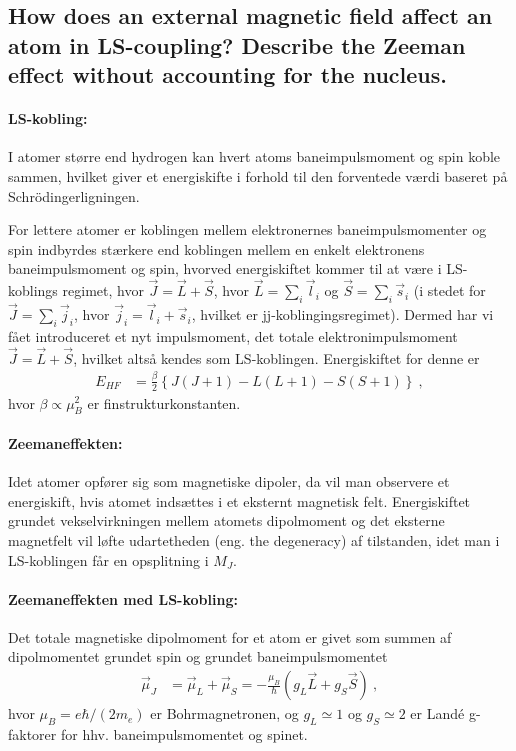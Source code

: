 \subsection{How does an external magnetic field affect an atom in LS-coupling? Describe the Zeeman effect without accounting for the nucleus.}


\paragraph{LS-kobling:} I atomer større end hydrogen kan hvert atoms baneimpulsmoment og spin koble sammen, hvilket giver et energiskifte i forhold til den forventede værdi baseret på Schrödingerligningen.

For lettere atomer er koblingen mellem elektronernes baneimpulsmomenter og spin indbyrdes stærkere end koblingen mellem en enkelt elektronens baneimpulsmoment og spin, hvorved energiskiftet kommer til at være i LS-koblings regimet, hvor $\Vec{J} = \Vec{L} + \Vec{S}$, hvor $\Vec{L} = \sum_i \Vec{l}_i$ og $\Vec{S} = \sum_i \Vec{s}_i$ (i stedet for $\Vec{J} = \sum_i \Vec{j}_i$, hvor $\Vec{j}_i = \Vec{l}_i + \Vec{s}_i$, hvilket er jj-koblingingsregimet). Dermed har vi fået introduceret et nyt impulsmoment, det totale elektronimpulsmoment $\Vec{J} = \Vec{L} + \Vec{S}$, hvilket altså kendes som LS-koblingen. Energiskiftet for denne er
\begin{align}
    E_{HF} &= \frac{\beta}{2} \left\{J(J+1) - L(L+1) - S(S+1)\right\} \: ,
\end{align}
hvor $\beta \propto \mu_B^2$ er finstrukturkonstanten.


\paragraph{Zeemaneffekten:} Idet atomer opfører sig som magnetiske dipoler, da vil man observere et energiskift, hvis atomet indsættes i et eksternt magnetisk felt. Energiskiftet grundet vekselvirkningen mellem atomets dipolmoment og det eksterne magnetfelt vil løfte udartetheden (eng. the degeneracy) af tilstanden, idet man i LS-koblingen får en opsplitning i $M_J$.


\paragraph{Zeemaneffekten med LS-kobling:} Det totale magnetiske dipolmoment for et atom er givet som summen af dipolmomentet grundet spin og grundet baneimpulsmomentet
\begin{align}
    \Vec{\mu}_J &= \Vec{\mu}_L + \Vec{\mu}_S = - \frac{\mu_B}{\hbar} \left( g_L \Vec{L} + g_S \Vec{S} \right) \: ,
\end{align}
hvor $\mu_B = e\hbar/(2m_e)$ er Bohrmagnetronen, og $g_L \simeq 1$ og $g_S \simeq 2$ er Landé g-faktorer for hhv. baneimpulsmomentet og spinet.

